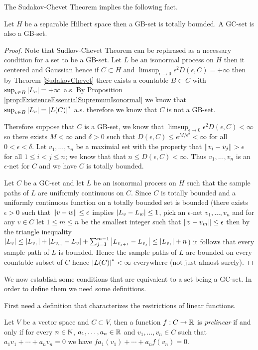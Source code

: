 The Sudakov-Chevet Theorem implies the following fact.
\begin{prop}\label{GCImpliesGB}Let $H$ be a separable Hilbert space then a GB-set is totally bounded.  A GC-set is also a GB-set.
\end{prop}
\begin{proof}
Note that Sudkov-Chevet Theorem can be rephrased as a necessary condition for a set to be a GB-set.   Let $L$ be an isonormal process on $H$ then it centered and Gaussian hence if $C \subset H$ and $\limsup_{\epsilon \to 0} \epsilon^2 D(\epsilon, C) = +\infty$ then by Theorem \ref{SudakovChevet} there exists a countable $B \subset C$ with $\sup_{v \in B} \left \vert L_v \right \vert = +\infty$ a.s.  By Proposition \ref{prop:ExistenceEssentialSupremumIsonormal} we know that $\sup_{v \in B} \left \vert L_v \right \vert  = \left \vert L(C) \right \vert^*$ a.s. therefore we know that $C$ is not a GB-set.  

Therefore suppose that $C$ is a GB-set, we know that $\limsup_{\epsilon \to 0} \epsilon^2 D(\epsilon, C) < \infty$ so there exists $M < \infty$ and $\delta > 0$ such that $D(\epsilon, C) \leq e^{M/\epsilon^2} < \infty$ for all $0 < \epsilon < \delta$.  Let $v_1, \dotsc, v_n$ be a maximial set with the property that $\left \lVert v_i - v_j \right \rVert > \epsilon$ for all $1 \leq i < j \leq n$; we know that that $n \leq D(\epsilon,C) < \infty$.  Thus $v_1, \dotsc, v_n$ is an $\epsilon$-net for $C$ and we have $C$ is totally bounded.

Let $C$ be a GC-set and let $L$ be an isonormal process on $H$ such that the sample paths of $L$ are uniformly continuous on $C$.  Since $C$ is totally bounded and a uniformly continuous function on a totally bounded set is bounded (there exists $\epsilon>0$ such that $\left \lVert v-w \right \rVert \leq \epsilon$ implies $\left \vert L_v - L_w \right \vert \leq 1$, pick an $\epsilon$-net $v_1, \dotsc, v_n$ and for any $v \in C$ let $1 \leq m \leq n$ be the smallest integer such that $\left \lVert v-v_m \right \rVert \leq \epsilon$ then by the triangle inequality $\left \vert L_v \right \vert \leq \left \vert L_{v_1} \right \vert + \left \vert L_{v_m} - L_v \right \vert + \sum_{j=1}^{m-1} \left \vert L_{v_{j+1}} - L_{v_j} \right \vert \leq \left \vert L_{v_1} \right \vert + n$)  it follows that every sample path of $L$ is bounded.  Hence the sample paths of $L$ are bounded on every countable subset of $C$ hence $\left \vert L(C) \right \vert^* < \infty$ everywhere (not just almost surely). 
\end{proof}


We now establish some conditions that are equivalent to a set being a GC-set.  In order to define them we need some definitions.

First need a definition that characterizes the restrictions of linear functions.
\begin{defn}Let $V$ be a vector space and $C \subset V$, then a function $f : C \to \mathbb{R}$ is \emph{prelinear} if and only if for every $n \in \mathbb{N}$, 
$a_1, \dotsc, a_n \in \mathbb{R}$ and $v_1, \dotsc, v_n \in C$ such that $a_1 v_1 + \dotsb + a_n v_n = 0$ we have $fa_1 (v_1) + \dotsb + a_n f(v_n) = 0$.
\end{defn}

